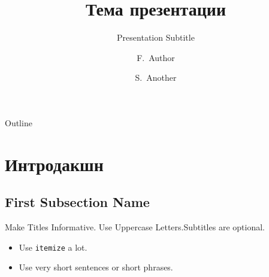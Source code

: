 \documentclass{beamer}
\title[Short Paper Title] %
{Тема презентации}
\subtitle
{Presentation Subtitle} %
\author[Author, Another] %
{F.~Author\inst{1} \and S.~Another\inst{2}}
\institute[Universities of Somewhere and Elsewhere] %
{
  \inst{1}%
  Department of Computer Science\\
  University of Somewhere
  \and
  \inst{2}%
  Department of Theoretical Philosophy\\
  University of Elsewhere}
\date[Short Occasion] %
\begin{document}
\begin{frame}
  \titlepage
\end{frame}

\begin{frame}{Outline}
  \tableofcontents
\end{frame}




\section{Интродакшн}

\subsection[Short First Subsection Name]{First Subsection Name}
\begin{frame}{Make Titles Informative. Use Uppercase Letters.}{Subtitles are optional.}

  \begin{itemize}
  \item
    Use \texttt{itemize} a lot.
  \item
    Use very short sentences or short phrases.
  \end{itemize}
\end{frame}
\end{document}
